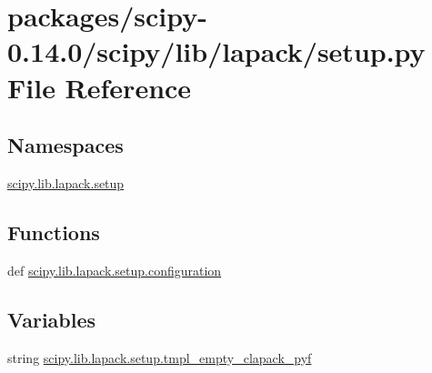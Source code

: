 \hypertarget{packages_2scipy-0_814_80_2scipy_2lib_2lapack_2setup_8py}{}\section{packages/scipy-\/0.14.0/scipy/lib/lapack/setup.py File Reference}
\label{packages_2scipy-0_814_80_2scipy_2lib_2lapack_2setup_8py}
\subsection*{Namespaces}
\begin{DoxyCompactItemize}
\item 
 \hyperlink{namespacescipy_1_1lib_1_1lapack_1_1setup}{scipy.\+lib.\+lapack.\+setup}
\end{DoxyCompactItemize}
\subsection*{Functions}
\begin{DoxyCompactItemize}
\item 
def \hyperlink{namespacescipy_1_1lib_1_1lapack_1_1setup_a4ccf51a41f19dc2b85e33dc1dd95041b}{scipy.\+lib.\+lapack.\+setup.\+configuration}
\end{DoxyCompactItemize}
\subsection*{Variables}
\begin{DoxyCompactItemize}
\item 
string \hyperlink{namespacescipy_1_1lib_1_1lapack_1_1setup_a3cbafb2240313264a4a5ff18cc8ad248}{scipy.\+lib.\+lapack.\+setup.\+tmpl\+\_\+empty\+\_\+clapack\+\_\+pyf}
\end{DoxyCompactItemize}
